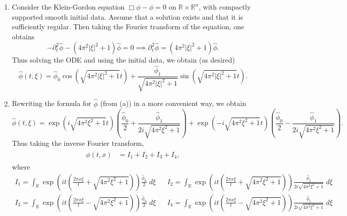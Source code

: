 \documentclass{article}
\begin{document}
\begin{enumerate}[itemsep =-2pt,label = (\alph{*})]
	\item Consider the Klein-Gordon equation $\Box\phi - \phi = 0$ on $\mathbb{R} \times \mathbb{R}^{n}$, with compactly supported smooth initial data. Assume that a solution exists and that it is sufficiently regular. Then taking the Fourier transform of the equation, one obtains 
	\begin{equation*}
		-\partial_{t}^{2}\hat\phi - (4\pi^{2}|\xi|^{2} + 1)\hat{\phi} = 0 \implies \partial_{t}^{2}\hat{\phi} = (4\pi^{2}|\xi|^{2} + 1)\hat{\phi}. 
	\end{equation*} 
	Thus solving the ODE and using the initial data, we obtain (as desired)
	\begin{equation*}
		\hat{\phi}(t, \xi) = \hat{\phi}_{0}\cos(\sqrt{4\pi^{2}|\xi|^{2} + 1}t) + \frac{\hat{\phi}_{1}}{\sqrt{4\pi^{2}|\xi|^{2} + 1}}\sin(\sqrt{4\pi^{2}|\xi|^{2} + 1}t). 
	\end{equation*} 
	\item Rewriting the formula for $\hat{\phi}$ (from (a)) in a more convenient way, we obtain 
	\begin{equation*}
		\hat{\phi}(t, \xi) = \exp\left(i\sqrt{4\pi^{2}\xi^{2} + 1}t\right)\left(\frac{\hat{\phi}_{0}}{2} + \frac{\hat{\phi}_{1}}{2i\sqrt{4\pi^{2}\xi^{2} + 1}}\right) + \exp\left(-i\sqrt{4\pi^{2}\xi^{2} + 1}t\right)\left(\frac{\hat{\phi}_{0}}{2} - \frac{\hat{\phi}_{1}}{2i\sqrt{4\pi^{2}\xi^{2} + 1}}\right). 
	\end{equation*} 
	Thus taking the inverse Fourier transform, 
	\begin{align*}
		\begin{split}
			\phi(t, x) &= I_{1} + I_{2} + I_{3} + I_{4}, 
		\end{split} 
	\end{align*} 
	where 
	\begin{equation*}
		\begin{matrix}
			\displaystyle I_{1} = \int_{\mathbb{R}}\exp\left(it\left(\frac{2\pi x\xi}{t}  + \sqrt{4\pi^{2}\xi^{2} + 1}\right)\right)\frac{\hat{\phi}_{0}}{2}\;d\xi && \displaystyle I_{2} = \int_{\mathbb{R}}\exp\left(it\left(\frac{2\pi x\xi}{t}  + \sqrt{4\pi^{2}\xi^{2} + 1}\right)\right)\frac{\hat{\phi}_{1}}{2i\sqrt{4\pi^{2}\xi^{2} + 1}}\;d\xi \\
			\displaystyle I_{3} = \int_{\mathbb{R}}\exp\left(it\left(\frac{2\pi x\xi}{t}  - \sqrt{4\pi^{2}\xi^{2} + 1}\right)\right)\frac{\hat{\phi}_{0}}{2}\;d\xi && \displaystyle I_{4} = \int_{\mathbb{R}}\exp\left(it\left(\frac{2\pi x\xi}{t}  - \sqrt{4\pi^{2}\xi^{2} + 1}\right)\right)\frac{\hat{\phi}_{1}}{2i\sqrt{4\pi^{2}\xi^{2} + 1}}\;d\xi

\end{matrix}
\end{equation*}
\end{enumerate}
\end{document}
